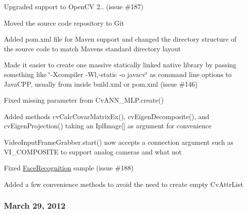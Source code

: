 \begin{DoxyItemize}
\item Upgraded support to Open\+C\+V 2.. (issue \#187)
\item Moved the source code repository to Git
\item Added {\ttfamily pom.\+xml} file for Maven support and changed the directory structure of the source code to match Maven\textquotesingle{}s standard directory layout
\item Made it easier to create one massive statically linked native library by passing something like \char`\"{}-\/\+Xcompiler -\/\+Wl,-\/static -\/o javacv\char`\"{} as command line options to Java\+C\+P\+P, usually from inside {\ttfamily build.\+xml} or {\ttfamily pom.\+xml} (issue \#146)
\item Fixed missing parameter from {\ttfamily Cv\+A\+N\+N\+\_\+\+M\+L\+P.\+create()}
\item Added methods {\ttfamily cv\+Calc\+Covar\+Matrix\+Ex()}, {\ttfamily cv\+Eigen\+Decomposite()}, and {\ttfamily cv\+Eigen\+Projection()} taking an {\ttfamily Ipl\+Image\mbox{[}\mbox{]}} as argument for convenience
\item {\ttfamily Video\+Input\+Frame\+Grabber.\+start()} now accepts a {\ttfamily connection} argument such as {\ttfamily V\+I\+\_\+\+C\+O\+M\+P\+O\+S\+I\+T\+E} to support analog cameras and what not
\item Fixed {\ttfamily \hyperlink{class_face_recognition}{Face\+Recognition}} sample (issue \#188)
\item Added a few convenience methods to avoid the need to create empty {\ttfamily Cv\+Attr\+List}
\end{DoxyItemize}

\subsubsection*{March 29, 2012}


